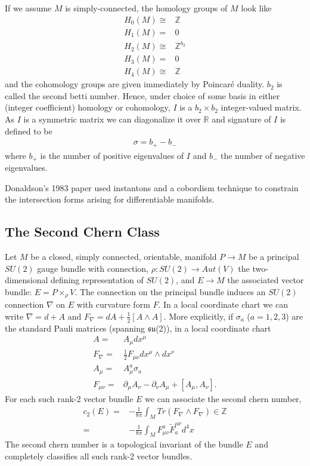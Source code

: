 \documentclass[12pt, onecolumn]{article}
\newenvironment{remark}[1][Remark]{\begin{trivlist}
\item[\hskip \labelsep {\bfseries #1}]}{\end{trivlist}}
\begin{document}
If we assume $M$ is simply-connected, the homology groups of $M$ look like
\begin{align*}
H_{0}(M) \cong & \mathbb{Z}\\
H_{1}(M) = &0\\
H_{2}(M) \cong & \mathbb{Z}^{b_{2}}\\
H_{3}(M) = &0\\
H_{4}(M) \cong & \mathbb{Z}
\end{align*}
and the cohomology groups are given immediately by Poincar\'{e} duality.  $b_{2}$ is called the second betti number.  Hence, under choice of some basis in either (integer coefficient) homology or cohomology, $I$ is a $b_{2} \times b_{2}$ integer-valued matrix.  As $I$ is a symmetric matrix we can diagonalize it over $\mathbb{R}$ and signature of $I$ is defined to be
\begin{align*}
\sigma  = b_{+}-b_{-}
\end{align*}
where $b_{+}$ is the number of positive eigenvalues of $I$ and $b_{-}$ the number of negative eigenvalues.

\begin{remark}
Donaldson's 1983 paper used instantons and a cobordism technique to constrain the intersection forms arising for differentiable manifolds.
\end{remark}

\subsection{The Second Chern Class}
Let $M$ be a closed, simply connected, orientable, manifold $P \rightarrow M$ be a principal $SU(2)$ gauge bundle with connection, $\rho:SU(2) \rightarrow Aut(V)$ the two-dimensional defining representation of $SU(2)$, and $E \rightarrow M$ the associated vector bundle: $E=P \times_{\rho} V$.  The connection on the principal bundle induces an $SU(2)$ connection $\nabla$ on $E$ with curvature form $F$.  In a local coordinate chart we can write $\nabla = d+A$ and $F_{\nabla}=dA+\frac{1}{2}[A \wedge A]$.  More explicitly, if $\sigma_{a}$ ($a=1,2,3$) are the standard Pauli matrices (spanning $\mathfrak{su}$(2)), in a local coordinate chart
\begin{align*}
A=&A_{\mu}dx^{\mu}\\
F_{\nabla}=&\frac{1}{2}F_{\mu \nu}dx^{\mu} \wedge dx^{\nu}\\
A_{\mu}=&A^{a}_{\mu}\sigma_{a}\\
F_{\mu \nu}=&\partial_{\mu}A_{\nu}-\partial_{\nu}A_{\mu}+[A_{\mu},A_{\nu}].
\end{align*}
For each such rank-2 vector bundle $E$ we can associate the second chern number,
\begin{align*}
c_{2}(E)=&-\frac{1}{8\pi}\int_{M}Tr(F_{\nabla} \wedge F_{\nabla}) \in \mathbb{Z}\\
=&-\frac{1}{8\pi}\int_{M}F^{a}_{\mu \nu}\tilde{F}^{\mu \nu}_{a}d^4x
\end{align*}
The second chern number is a topological invariant of the bundle $E$ and completely classifies all such rank-2 vector bundles. 
\end{document}
